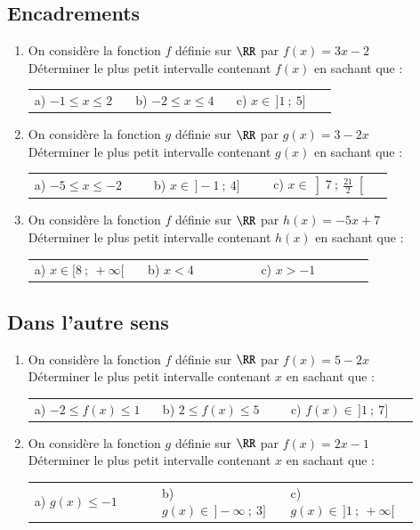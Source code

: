 \documentclass[oneside,12pt]{article}          %
\begin{document}
\subsection{Encadrements}
\begin{enumerate}
	\item On considère la fonction $f$ définie sur $\RR$ par $f(x)=3x-2$ \\	
	Déterminer le plus petit intervalle contenant $f(x)$ en sachant que : \\
	\begin{tabular}{p{0.3\linewidth} p{0.3\linewidth} p{0.3\linewidth}}
		a) $-1 \leq x \leq2$ & b) $-2\leq x \leq4$ & c) $x\in\,]1~;~5]$
	\end{tabular}
	\item On considère la fonction $g$ définie sur $\RR$ par $g(x)=3-2x$ \\	
	Déterminer le plus petit intervalle contenant $g(x)$ en sachant que : \\
	\begin{tabular}{p{0.3\linewidth} p{0.3\linewidth} p{0.3\linewidth}}
		a) $-5 \leq x \leq-2$ & b) $x\in\,]-1~;~4]$ & c) $x\in\left]7~;~\frac{21}{2}\right[$
	\end{tabular}
	\item On considère la fonction $f$ définie sur $\RR$ par $h(x)=-5x+7$ \\	
	Déterminer le plus petit intervalle contenant $h(x)$ en sachant que : \\
	\begin{tabular}{p{0.3\linewidth} p{0.3\linewidth} p{0.3\linewidth}}
		a) $x\in[8~;~+\infty[$ & b) $x<4$ & c) $x>-1$
	\end{tabular}
\end{enumerate}



\subsection{Dans l'autre sens}
\begin{enumerate}
	\item On considère la fonction $f$ définie sur $\RR$ par $f(x)=5-2x$\\
	Déterminer le plus petit intervalle contenant $x$ en sachant que : \\
	\begin{tabular}{p{0.3\linewidth} p{0.3\linewidth} p{0.3\linewidth}}
		a) $-2 \leq f(x) \leq 1$ & b) $2 \leq f(x) \leq 5$ & c) $f(x) \in \, ]1~;~7]$
	\end{tabular}
	\item On considère la fonction $g$ définie sur $\RR$ par $f(x)=2x-1$\\
	Déterminer le plus petit intervalle contenant $x$ en sachant que : \\
	\begin{tabular}{p{0.3\linewidth} p{0.3\linewidth} p{0.3\linewidth}}
		a) $g(x) \leq -1$ & b) $g(x) \in\, ]-\infty~;~3]$ & c) $g(x) \in\, ]1~;~+\infty[$
	\end{tabular}
\end{enumerate}
\end{document}
